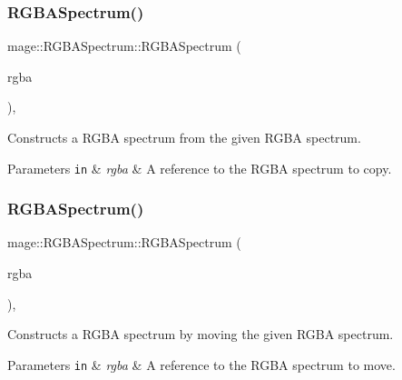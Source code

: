 \subsubsection{\texorpdfstring{R\+G\+B\+A\+Spectrum()}{RGBASpectrum()}\hspace{0.1cm}{\footnotesize\ttfamily [3/10]}}
{\footnotesize\ttfamily mage\+::\+R\+G\+B\+A\+Spectrum\+::\+R\+G\+B\+A\+Spectrum (\begin{DoxyParamCaption}\item[{const \hyperlink{structmage_1_1_r_g_b_a_spectrum}{R\+G\+B\+A\+Spectrum} \&}]{rgba }\end{DoxyParamCaption})\hspace{0.3cm}{\ttfamily [default]}, {\ttfamily [noexcept]}}

Constructs a R\+G\+BA spectrum from the given R\+G\+BA spectrum.


\begin{DoxyParams}[1]{Parameters}
\mbox{\tt in}  & {\em rgba} & A reference to the R\+G\+BA spectrum to copy. \\
\hline
\end{DoxyParams}
\hypertarget{structmage_1_1_r_g_b_a_spectrum_ac53917f6129baafb04d812fcef6e4f56}{}\label{structmage_1_1_r_g_b_a_spectrum_ac53917f6129baafb04d812fcef6e4f56} 
\subsubsection{\texorpdfstring{R\+G\+B\+A\+Spectrum()}{RGBASpectrum()}\hspace{0.1cm}{\footnotesize\ttfamily [4/10]}}
{\footnotesize\ttfamily mage\+::\+R\+G\+B\+A\+Spectrum\+::\+R\+G\+B\+A\+Spectrum (\begin{DoxyParamCaption}\item[{\hyperlink{structmage_1_1_r_g_b_a_spectrum}{R\+G\+B\+A\+Spectrum} \&\&}]{rgba }\end{DoxyParamCaption})\hspace{0.3cm}{\ttfamily [default]}, {\ttfamily [noexcept]}}

Constructs a R\+G\+BA spectrum by moving the given R\+G\+BA spectrum.


\begin{DoxyParams}[1]{Parameters}
\mbox{\tt in}  & {\em rgba} & A reference to the R\+G\+BA spectrum to move. \\
\hline
\end{DoxyParams}
\hypertarget{structmage_1_1_r_g_b_a_spectrum_ab338627fcbc579dd78f7e1fde38adf0c}{}\label{structmage_1_1_r_g_b_a_spectrum_ab338627fcbc579dd78f7e1fde38adf0c} 
